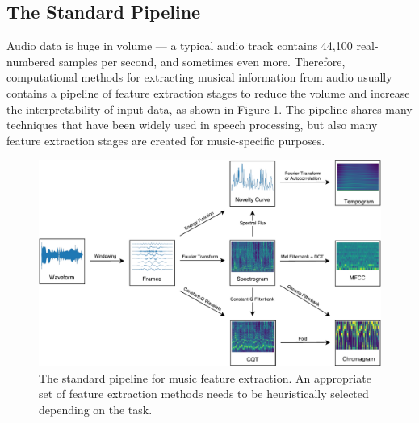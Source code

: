 \subsection{The Standard Pipeline}

Audio data is huge in volume --- a typical audio track contains 44,100 real-numbered samples per second, and sometimes even more.
Therefore, computational methods for extracting musical information from audio usually contains a pipeline of feature extraction stages to reduce the volume and increase the interpretability of input data, as shown in Figure \ref{fig:pipeline}.
The pipeline shares many techniques that have been widely used in speech processing, but also many feature extraction stages are created for music-specific purposes.

\begin{figure}[t]
	\includegraphics[width=\textwidth]{pipeline.pdf}
	\caption{\small The standard pipeline for music feature extraction. An appropriate set of feature extraction methods needs to be heuristically selected depending on the task.}\label{fig:pipeline}
\end{figure}

